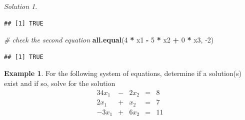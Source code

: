 \documentclass[
]{book}
\newenvironment{Shaded}{\begin{snugshade}}{\end{snugshade}}
\newcommand{\CommentTok}[1]{\textcolor[rgb]{0.56,0.35,0.01}{\textit{#1}}}
\newcommand{\DecValTok}[1]{\textcolor[rgb]{0.00,0.00,0.81}{#1}}
\newcommand{\KeywordTok}[1]{\textcolor[rgb]{0.13,0.29,0.53}{\textbf{#1}}}
\newcommand{\NormalTok}[1]{#1}
\newcommand{\OperatorTok}[1]{\textcolor[rgb]{0.81,0.36,0.00}{\textbf{#1}}}
\newcommand{\StringTok}[1]{\textcolor[rgb]{0.31,0.60,0.02}{#1}}
\theoremstyle{definition}
\theoremstyle{definition}
\newtheorem{example}{Example}[chapter]
\theoremstyle{definition}
\theoremstyle{definition}
\theoremstyle{remark}
\newtheorem*{solution}{Solution}
\begin{document}
\begin{solution}
\begin{verbatim}
## [1] TRUE
\end{verbatim}

\begin{Shaded}
\begin{Highlighting}[]
\CommentTok{# check the second equation}
\KeywordTok{all.equal}\NormalTok{(}\DecValTok{4} \OperatorTok{*}\StringTok{ }\NormalTok{x1 }\OperatorTok{-}\StringTok{ }\DecValTok{5} \OperatorTok{*}\StringTok{ }\NormalTok{x2 }\OperatorTok{+}\StringTok{ }\DecValTok{0} \OperatorTok{*}\StringTok{ }\NormalTok{x3, }\DecValTok{-2}\NormalTok{)}
\end{Highlighting}
\end{Shaded}

\begin{verbatim}
## [1] TRUE
\end{verbatim}

\end{solution}

\begin{example}
For the following system of equations, determine if a solution(s) exist and if so, solve for the solution
\begin{alignat*}{3}
4 x_1 & {}-{} & 2 x_2 & {}={} & 8\\
2 x_1 & {}+{} & x_2 & {}={} & 7 \\
-3 x_1 & {}+{} & 6 x_2 &{}={} & 11
\end{alignat*}
\end{example}
\end{document}
